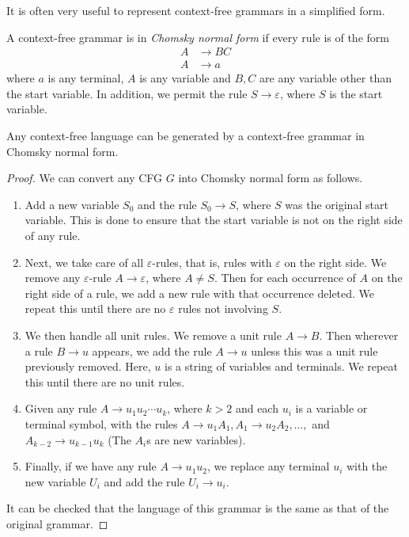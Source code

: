 \vspace{3mm}
It is often very useful to represent context-free grammars in a simplified form.

\begin{definition}
A context-free grammar is in \textit{Chomsky normal form} if every rule is of the form
\begin{align*}
    A&\to BC \\
    A&\to a
\end{align*}
where $a$ is any terminal, $A$ is any variable and $B,C$ are any variable other than the start variable. In addition, we permit the rule $S\to\varepsilon$, where $S$ is the start variable.
\end{definition}

\begin{theorem}
Any context-free language can be generated by a context-free grammar in Chomsky normal form.
\end{theorem}
\begin{proof}
We can convert any CFG $G$ into Chomsky normal form as follows.

\begin{enumerate}
    \item Add a new variable $S_0$ and the rule $S_0\to S$, where $S$ was the original start variable. This is done to ensure that the start variable is not on the right side of any rule.
    \item Next, we take care of all $\varepsilon$-rules, that is, rules with $\varepsilon$ on the right side. We remove any $\varepsilon$-rule $A\to\varepsilon$, where $A\neq S$. Then for each occurrence of $A$ on the right side of a rule, we add a new rule with that occurrence deleted. We repeat this until there are no $\varepsilon$ rules not involving $S$.
    \item We then handle all unit rules. We remove a unit rule $A\to B$. Then wherever a rule $B\to u$ appears, we add the rule $A\to u$ unless this was a unit rule previously removed. Here, $u$ is a string of variables and terminals. We repeat this until there are no unit rules.
    \item Given any rule $A\to u_1u_2\cdots u_k$, where $k>2$ and each $u_i$ is a variable or terminal symbol, with the rules $A\to u_1A_1, A_1\to u_2A_2, \ldots,$ and $A_{k-2}\to u_{k-1}u_k$ (The $A_i$s  are new variables).
    \item Finally, if we have any rule $A\to u_1u_2$, we replace any terminal $u_i$ with the new variable $U_i$ and add the rule $U_i\to u_i$.
\end{enumerate}

It can be checked that the language of this grammar is the same as that of the original grammar.
\end{proof}

